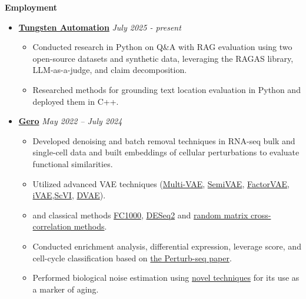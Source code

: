 \documentclass[12pt]{article}   %
\begin{document}
\noindent \textbf{\Large Employment}
\begin{itemize}

	\item \href{https://www.tungstenautomation.com/}{\textbf{Tungsten Automation}} \hfill \textit{July 2025 - present}
	\begin{itemize}
    \item Conducted research in Python on Q\&A with RAG evaluation using two open-source datasets and synthetic data, leveraging the RAGAS library, LLM-as-a-judge, and claim decomposition.
    \item Researched methods for grounding text location evaluation in Python and deployed them in C++.
	\end{itemize}
	
    \item \href{https://gero.ai/}{\textbf{Gero}} \hfill \textit{May 2022 -- July 2024}
    \begin{itemize}
        \item Developed denoising and batch removal techniques in RNA-seq bulk and single-cell data and built embeddings of cellular perturbations to evaluate functional similarities.
        \item Utilized advanced VAE techniques (\href{https://openaccess.thecvf.com/content/ICCV2021/papers/Xu_Multi-VAE_Learning_Disentangled_View-Common_and_View-Peculiar_Visual_Representations_for_Multi-View_ICCV_2021_paper.pdf}{Multi-VAE}, \href{https://arxiv.org/abs/1603.02514}{SemiVAE}, \href{https://arxiv.org/abs/1802.05983}{FactorVAE}, \href{https://arxiv.org/abs/1907.04809}{iVAE},\href{https://docs.scvi-tools.org/en/stable/api/reference/scvi.model.SCVI.html#scvi.model.SCVI}{ScVI}, \href{https://arxiv.org/abs/1509.05982}{DVAE}).
        \item and classical methods \href{https://www.degruyter.com/document/doi/10.1515/sagmb-2016-0072/html}{FC1000}, \href{https://genomebiology.biomedcentral.com/articles/10.1186/s13059-014-0550-8}{DESeq2} and \href{https://arxiv.org/abs/cond-mat/0108023}{random matrix cross-correlation methods}. 
        \item Conducted enrichment analysis, differential expression, leverage score, and cell-cycle classification 
              based on \href{https://pubmed.ncbi.nlm.nih.gov/35688146/}{the Perturb-seq paper}.
        \item Performed biological noise estimation using \href{https://www.biorxiv.org/content/10.1101/2022.06.23.497402v1}{novel techniques} for its use as a marker of aging.
    \end{itemize}


\end{itemize}
\end{document}
